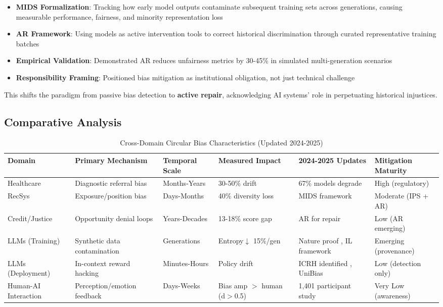 \documentclass[11pt,a4paper]{article}
\begin{document}
\begin{itemize}
    \item \textbf{MIDS Formalization}: Tracking how early model outputs contaminate subsequent training sets across generations, causing measurable performance, fairness, and minority representation loss
    \item \textbf{AR Framework}: Using models as active intervention tools to correct historical discrimination through curated representative training batches
    \item \textbf{Empirical Validation}: Demonstrated AR reduces unfairness metrics by 30-45\% in simulated multi-generation scenarios
    \item \textbf{Responsibility Framing}: Positioned bias mitigation as institutional obligation, not just technical challenge
\end{itemize}

This shifts the paradigm from passive bias detection to \textbf{active repair}, acknowledging AI systems' role in perpetuating historical injustices.

\subsection{Comparative Analysis}

\begin{table}[htbp]
\centering
\caption{Cross-Domain Circular Bias Characteristics (Updated 2024-2025)}
\label{tab:cross_domain}
\small
\begin{tabular}{@{}p{2cm}p{2.2cm}p{1.8cm}p{2cm}p{2.2cm}p{2cm}@{}}
\toprule
\textbf{Domain} & \textbf{Primary Mechanism} & \textbf{Temporal Scale} & \textbf{Measured Impact} & \textbf{2024-2025 Updates} & \textbf{Mitigation Maturity} \\
\midrule
Healthcare & Diagnostic referral bias & Months-Years & 30-50\% drift \cite{varoquaux2022,nestor2024} & 67\% models degrade \cite{nestor2024} & High (regulatory) \\
RecSys & Exposure/position bias & Days-Months & 40\% diversity loss \cite{chen2023} & MIDS framework \cite{wyllie2024} & Moderate (IPS + AR) \\
Credit/Justice & Opportunity denial loops & Years-Decades & 13-18\% score gap \cite{vokinger2021} & AR for repair \cite{wyllie2024} & Low (AR emerging) \\
LLMs (Training) & Synthetic data contamination & Generations & Entropy$\downarrow$ 15\%/gen \cite{shumailov2024} & Nature proof \cite{shumailov2024}, IL framework \cite{ren2024} & Emerging (provenance) \\
LLMs (Deployment) & In-context reward hacking & Minutes-Hours & Policy drift \cite{pan2024} & ICRH identified \cite{pan2024}, UniBias \cite{zhou2024} & Low (detection only) \\
Human-AI Interaction & Perception/emotion feedback & Days-Weeks & Bias amp $>$ human (d$>$0.5) \cite{glickman2024} & 1,401 participant study \cite{glickman2024} & Very Low (awareness) \\
\bottomrule
\end{tabular}
\end{table}
\end{document}
